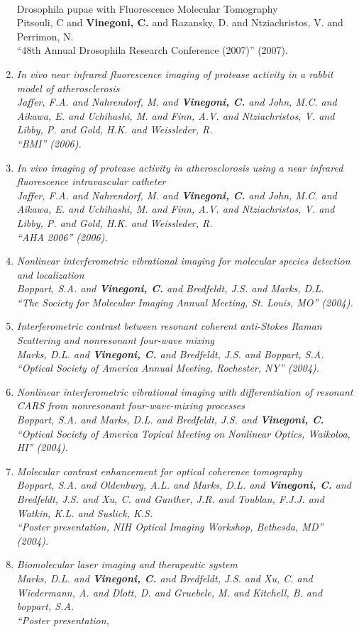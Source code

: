 \documentclass{resume}
\begin{document}
\begin{category}{~~}
\begin{enumerate}
Drosophila pupae with Fluorescence Molecular Tomography \\ Pitsouli, C and {\bf Vinegoni, C.} and Razansky, D. and Ntziachristos, V. and Perrimon, N. \\ ``48th Annual Drosophila Research Conference (2007)''  (2007). \item \it In vivo near infrared fluorescence imaging of protease activity in a rabbit model of atherosclerosis \\ Jaffer, F.A. and Nahrendorf, M. and {\bf Vinegoni, C.} and John, M.C. and Aikawa, E. and Uchihashi, M. and Finn, A.V. and Ntziachristos, V. and Libby, P. and Gold, H.K. and Weissleder, R. \\ ``BMI''  (2006). \item \it In vivo imaging of protease activity in atherosclorosis using a near infrared fluorescence intravascular catheter \\ Jaffer, F.A. and Nahrendorf, M. and {\bf Vinegoni, C.} and John, M.C. and Aikawa, E. and Uchihashi, M. and Finn, A.V. and Ntziachristos, V. and Libby, P. and Gold, H.K. and Weissleder, R. \\ ``AHA 2006''  (2006). \item \it Nonlinear interferometric vibrational imaging for molecular species detection and localization \\ Boppart, S.A. and {\bf Vinegoni, C.} and Bredfeldt, J.S. and Marks, D.L. \\ ``The Society for Molecular Imaging Annual Meeting, St. Louis, MO''  (2004). \item \it Interferometric contrast between resonant coherent anti-Stokes Raman Scattering and nonresonant four-wave mixing \\ Marks, D.L. and {\bf Vinegoni, C.} and Bredfeldt, J.S. and Boppart, S.A. \\ ``Optical Society of America Annual Meeting, Rochester, NY''  (2004). \item \it Nonlinear interferometric vibrational imaging with differentiation of resonant CARS from nonresonant four-wave-mixing processes \\ Boppart, S.A. and Marks, D.L. and Bredfeldt, J.S. and {\bf Vinegoni, C.} \\ ``Optical Society of America Topical Meeting on Nonlinear Optics, Waikoloa, HI''  (2004). \item \it Molecular contrast enhancement for optical coherence tomography \\ Boppart, S.A. and Oldenburg, A.L. and Marks, D.L. and {\bf Vinegoni, C.} and Bredfeldt, J.S. and Xu, C. and Gunther, J.R. and Toublan, F.J.J. and Watkin, K.L. and Suslick, K.S. \\ ``Poster presentation, NIH Optical Imaging Workshop, Bethesda, MD''  (2004). \item \it Biomolecular laser imaging and therapeutic system \\ Marks, D.L. and {\bf Vinegoni, C.} and Bredfeldt, J.S. and Xu, C. and Wiedermann, A. and Dlott, D. and Gruebele, M. and Kitchell, B. and boppart, S.A. \\ ``Poster presentation, 
\end{enumerate}
\end{category}
\end{document}
